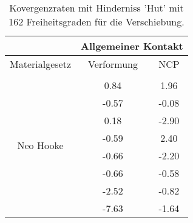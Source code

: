 \begin{table} 
\centering 
\begin{tabular}{c|cc|} 
\cline{2-3} 
 & \multicolumn{2}{|c|}{Allgemeiner Kontakt} \\ 
\hline 
\multicolumn{1}{|c|}{Materialgesetz} & \multicolumn{1}{c|}{Verformung} & \multicolumn{1}{c|}{NCP} \\ 
\hline 
\multicolumn{1}{|c|}{\multirow{9}{*}{Neo Hooke}} &\multicolumn{1}{|c|}{} & \multicolumn{1}{|c|}{} \\ 
\multicolumn{1}{|c|}{} & \multicolumn{1}{|c|}{      0.84} & \multicolumn{1}{|c|}{      1.96} \\ 
\multicolumn{1}{|c|}{} & \multicolumn{1}{|c|}{     -0.57} & \multicolumn{1}{|c|}{     -0.08} \\ 
\multicolumn{1}{|c|}{} & \multicolumn{1}{|c|}{      0.18} & \multicolumn{1}{|c|}{     -2.90} \\ 
\multicolumn{1}{|c|}{} & \multicolumn{1}{|c|}{     -0.59} & \multicolumn{1}{|c|}{      2.40} \\ 
\multicolumn{1}{|c|}{} & \multicolumn{1}{|c|}{     -0.66} & \multicolumn{1}{|c|}{     -2.20} \\ 
\multicolumn{1}{|c|}{} & \multicolumn{1}{|c|}{     -0.66} & \multicolumn{1}{|c|}{     -0.58} \\ 
\multicolumn{1}{|c|}{} & \multicolumn{1}{|c|}{     -2.52} & \multicolumn{1}{|c|}{     -0.82} \\ 
\multicolumn{1}{|c|}{} & \multicolumn{1}{|c|}{     -7.63} & \multicolumn{1}{|c|}{     -1.64} \\ 
\hline 
\end{tabular}\caption{Kovergenzraten mit Hinderniss 'Hut' mit 162 Freiheitsgraden für die Verschiebung.}\label{tab:Rate_Hut_level2}
\end{table} 
